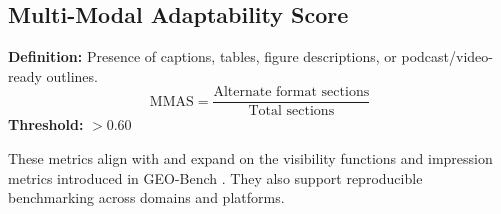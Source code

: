 \subsection{Multi-Modal Adaptability Score}
\textbf{Definition:} Presence of captions, tables, figure descriptions, or podcast/video-ready outlines.
\begin{equation}
\text{MMAS} = \frac{\text{Alternate format sections}}{\text{Total sections}}
\end{equation}
\textbf{Threshold:} $> 0.60$

These metrics align with and expand on the visibility functions and impression metrics introduced in GEO-Bench \cite{aggarwal2024geo}. They also support reproducible benchmarking across domains and platforms.
